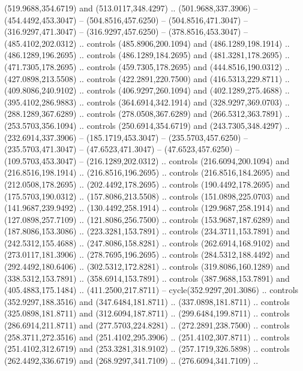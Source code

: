 {{\begin{scope}[y=-0.80pt,x=0.80pt,scale=0.038,xshift=-300pt,yshift=250pt]
        (519.9688,354.6719) and (513.0117,348.4297) .. (501.9688,337.3906) --
        (454.4492,453.3047) -- (504.8516,457.6250) -- (504.8516,471.3047) --
        (316.9297,471.3047) -- (316.9297,457.6250) -- (378.8516,453.3047) --
        (485.4102,202.0312) .. controls (485.8906,200.1094) and (486.1289,198.1914) ..
        (486.1289,196.2695) .. controls (486.1289,184.2695) and (481.3281,178.2695) ..
        (471.7305,178.2695) .. controls (459.7305,178.2695) and (444.8516,190.0312) ..
        (427.0898,213.5508) .. controls (422.2891,220.7500) and (416.5313,229.8711) ..
        (409.8086,240.9102) .. controls (406.9297,260.1094) and (402.1289,275.4688) ..
        (395.4102,286.9883) .. controls (364.6914,342.1914) and (328.9297,369.0703) ..
        (288.1289,367.6289) .. controls (278.0508,367.6289) and (266.5312,363.7891) ..
        (253.5703,356.1094) .. controls (250.6914,354.6719) and (243.7305,348.4297) ..
        (232.6914,337.3906) -- (185.1719,453.3047) -- (235.5703,457.6250) --
        (235.5703,471.3047) -- (47.6523,471.3047) -- (47.6523,457.6250) --
        (109.5703,453.3047) -- (216.1289,202.0312) .. controls (216.6094,200.1094) and
        (216.8516,198.1914) .. (216.8516,196.2695) .. controls (216.8516,184.2695) and
        (212.0508,178.2695) .. (202.4492,178.2695) .. controls (190.4492,178.2695) and
        (175.5703,190.0312) .. (157.8086,213.5508) .. controls (151.0898,225.0703) and
        (141.9687,239.9492) .. (130.4492,258.1914) .. controls (129.9687,258.1914) and
        (127.0898,257.7109) .. (121.8086,256.7500) .. controls (153.9687,187.6289) and
        (187.8086,153.3086) .. (223.3281,153.7891) .. controls (234.3711,153.7891) and
        (242.5312,155.4688) .. (247.8086,158.8281) .. controls (262.6914,168.9102) and
        (273.0117,181.3906) .. (278.7695,196.2695) .. controls (284.5312,188.4492) and
        (292.4492,180.6406) .. (302.5312,172.8281) .. controls (319.8086,160.1289) and
        (338.5312,153.7891) .. (358.6914,153.7891) .. controls (387.9688,153.7891) and
        (405.4883,175.1484) .. (411.2500,217.8711) -- cycle(352.9297,201.3086) ..
        controls (352.9297,188.3516) and (347.6484,181.8711) .. (337.0898,181.8711) ..
        controls (325.0898,181.8711) and (312.6094,187.8711) .. (299.6484,199.8711) ..
        controls (286.6914,211.8711) and (277.5703,224.8281) .. (272.2891,238.7500) ..
        controls (258.3711,272.3516) and (251.4102,295.3906) .. (251.4102,307.8711) ..
        controls (251.4102,312.6719) and (253.3281,318.9102) .. (257.1719,326.5898) ..
        controls (262.4492,336.6719) and (268.9297,341.7109) .. (276.6094,341.7109) ..

\end{scope}}}
